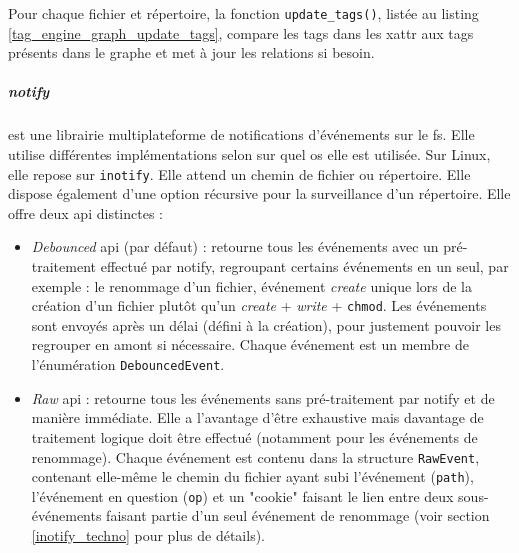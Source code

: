 \bigbreak
Pour chaque fichier et répertoire, la fonction \texttt{update_tags()}, listée au listing 
\ref{tag_engine_graph_update_tags}, compare les tags dans les \acrshort{xattr} aux tags présents 
dans le graphe et met à jour les relations si besoin.
\bigbreak
{}
\bigbreak

\subparagraph{notify}\label{tag_engine_notify}
est une librairie multiplateforme de notifications d'événements sur le \acrshort{fs}. 
Elle utilise différentes implémentations selon sur quel \acrshort{os} elle est utilisée. Sur Linux, 
elle repose sur \texttt{inotify}. Elle attend un chemin de fichier ou répertoire. Elle 
dispose également d'une option récursive pour la surveillance d'un répertoire. Elle offre deux 
\acrshort{api} distinctes :
\begin{itemize}
    \item \textit{Debounced} \acrshort{api} (par défaut) : retourne tous les événements avec un 
        pré-traitement effectué par notify, regroupant certains événements en un seul, par exemple :
        le renommage d'un fichier, événement \textit{create} unique lors de la création d'un fichier 
        plutôt qu'un \textit{create} + \textit{write} + \texttt{chmod}. Les événements 
        sont envoyés après un délai (défini à la création), pour justement pouvoir les regrouper 
        en amont si nécessaire. Chaque événement est un membre de l'énumération \texttt{DebouncedEvent}.
    \item \textit{Raw} \acrshort{api} : retourne tous les événements sans pré-traitement par notify 
        et de manière immédiate. Elle a l'avantage d'être exhaustive mais davantage de traitement 
        logique doit être effectué (notamment pour les événements de renommage). Chaque événement 
        est contenu dans la structure \texttt{RawEvent}, contenant elle-même le chemin 
        du fichier ayant subi l'événement (\texttt{path}), l'événement en question 
        (\texttt{op}) et un "cookie" faisant le lien entre deux sous-événements faisant 
        partie d'un seul événement de renommage (voir section \ref{inotify_techno} pour plus de détails).
\end{itemize}
